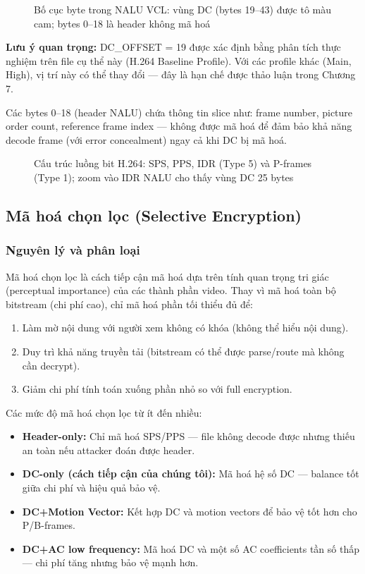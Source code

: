 \begin{figure}[ht]
\centering

\caption{Bố cục byte trong NALU VCL: vùng DC (bytes 19--43) được tô màu cam;
         bytes 0--18 là header không mã hoá}
\label{fig:dc_offset}
\end{figure}

\textbf{Lưu ý quan trọng:} DC\_OFFSET = 19 được xác định bằng phân tích thực nghiệm
trên file cụ thể này (H.264 Baseline Profile). Với các profile khác (Main, High),
vị trí này có thể thay đổi --- đây là hạn chế được thảo luận trong Chương 7.

Các bytes 0--18 (header NALU) chứa thông tin slice như: frame number, picture order
count, reference frame index --- không được mã hoá để đảm bảo khả năng decode
frame (với error concealment) ngay cả khi DC bị mã hoá.

\begin{figure}[ht]
\centering

\caption{Cấu trúc luồng bit H.264: SPS, PPS, IDR (Type 5) và P-frames (Type 1);
         zoom vào IDR NALU cho thấy vùng DC 25 bytes}
\label{fig:nalu_structure}
\end{figure}

\subsection{Mã hoá chọn lọc (Selective Encryption)}

\subsubsection{Nguyên lý và phân loại}

Mã hoá chọn lọc \cite{cheng_selective} là cách tiếp cận mã hoá dựa trên tính
quan trọng tri giác (perceptual importance) của các thành phần video. Thay vì
mã hoá toàn bộ bitstream (chi phí cao), chỉ mã hoá phần tối thiểu đủ để:
\begin{enumerate}
  \item Làm mờ nội dung với người xem không có khóa (không thể hiểu nội dung).
  \item Duy trì khả năng truyền tải (bitstream có thể được parse/route mà không cần decrypt).
  \item Giảm chi phí tính toán xuống phần nhỏ so với full encryption.
\end{enumerate}

Các mức độ mã hoá chọn lọc từ ít đến nhiều:
\begin{itemize}
  \item \textbf{Header-only:} Chỉ mã hoá SPS/PPS --- file không decode được nhưng
        thiếu an toàn nếu attacker đoán được header.
  \item \textbf{DC-only (cách tiếp cận của chúng tôi):} Mã hoá hệ số DC --- balance
        tốt giữa chi phí và hiệu quả bảo vệ.
  \item \textbf{DC+Motion Vector:} Kết hợp DC và motion vectors để bảo vệ tốt hơn
        cho P/B-frames.
  \item \textbf{DC+AC low frequency:} Mã hoá DC và một số AC coefficients tần số thấp
        --- chi phí tăng nhưng bảo vệ mạnh hơn.
\end{itemize}

